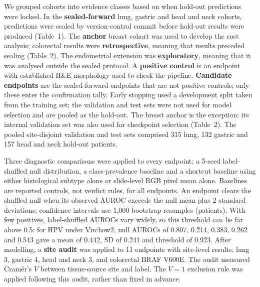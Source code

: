 \documentclass[a4paper,10pt,twocolumn]{extarticle}
\begin{document}
We grouped cohorts into evidence classes based on when hold-out predictions were locked. In the \textbf{sealed-forward} lung, gastric and head and neck cohorts, predictions were sealed by version-control commit before hold-out results were produced (Table~1). The \textbf{anchor} breast cohort was used to develop the cost analysis; colorectal results were \textbf{retrospective}, meaning that results preceded sealing (Table~2). The endometrial extension was \textbf{exploratory}, meaning that it was analysed outside the sealed protocol. A \textbf{positive control} is an endpoint with established H\&E morphology used to check the pipeline. \textbf{Candidate endpoints} are the sealed-forward endpoints that are not positive controls; only these enter the confirmation tally. Early stopping used a development split taken from the training set; the validation and test sets were not used for model selection and are pooled as the hold-out. The breast anchor is the exception: its internal validation set was also used for checkpoint selection (Table~2). The pooled site-disjoint validation and test sets comprised 315 lung, 132 gastric and 157 head and neck hold-out patients.

Three diagnostic comparisons were applied to every endpoint: a 5-seed label-shuffled null distribution, a class-prevalence baseline and a shortcut baseline using either histological subtype alone or slide-level RGB pixel mean alone. Baselines are reported controls, not verdict rules, for all endpoints. An endpoint clears the shuffled null when its observed AUROC exceeds the null mean plus 2 standard deviations; confidence intervals use 1{,}000 bootstrap resamples (patients). With few positives, label-shuffled AUROCs vary widely, so this threshold can lie far above 0.5: for HPV under Virchow2, null AUROCs of 0.807, 0.214, 0.383, 0.262 and 0.543 gave a mean of 0.442, SD of 0.241 and threshold of 0.923. After modelling, a \textbf{site audit} was applied to 11 endpoints with site-level results: lung 3, gastric 4, head and neck 3, and colorectal BRAF V600E. The audit measured Cram\'er's $V$ between tissue-source site and label. The $V=1$ exclusion rule was applied following this audit, rather than fixed in advance.
\end{document}
